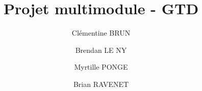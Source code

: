 \documentclass[10pt,a4paper]{beamer}
\author{Cl\'ementine BRUN \and Brendan LE NY \and Myrtille PONGE \and Brian RAVENET}
\title{Projet multimodule - GTD}
\institute{Universit\'e de Nantes}
\begin{document}
\begin{frame}
\maketitle
\end{frame}
















\end{document}
